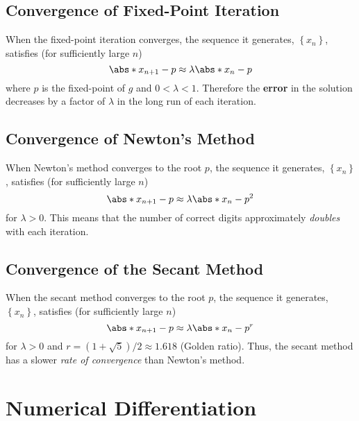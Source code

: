 \documentclass{article}
\begin{document}
\subsection{Convergence of Fixed-Point Iteration}
When the fixed-point iteration converges, the sequence it generates,
\(\left\{ x_n \right\}\), satisfies (for sufficiently large \(n\))
\begin{equation*}
    \abs*{x_{n + 1} - p} \approx \lambda \abs*{x_n - p}
\end{equation*}
where \(p\) is the fixed-point of \(g\) and \(0 < \lambda < 1\).
Therefore the \textbf{error} in the solution decreases by a factor of
\(\lambda\) in the long run of each iteration.
\subsection{Convergence of Newton's Method}
When Newton's method converges to the root \(p\), the sequence it
generates, \(\left\{ x_n \right\}\), satisfies (for sufficiently large
\(n\))
\begin{equation*}
    \abs*{x_{n + 1} - p} \approx \lambda \abs*{x_n - p}^2
\end{equation*}
for \(\lambda > 0\). This means that the number of correct digits
approximately \textit{doubles} with each iteration.
\subsection{Convergence of the Secant Method}
When the secant method converges to the root \(p\), the sequence it
generates, \(\left\{ x_n \right\}\), satisfies (for sufficiently large
\(n\))
\begin{equation*}
    \abs*{x_{n + 1} - p} \approx \lambda \abs*{x_n - p}^r
\end{equation*}
for \(\lambda > 0\) and
\(r = \left( 1 + \sqrt{5} \right)/2 \approx 1.618\) (Golden ratio). Thus,
the secant method has a slower \textit{rate of convergence} than
Newton's method.
\section{Numerical Differentiation}
\end{document}
